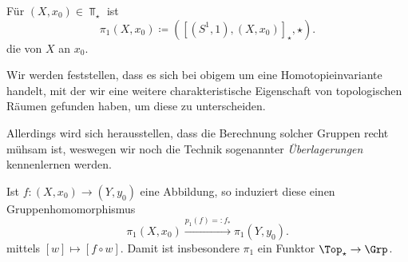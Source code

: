 \begin{definition}[Fundamentalgruppe]\label{def:fundamentalgruppe}
    Für $(X,x_0) \in \Top_{\star}$ ist 
    \[
        \pi_1(X,x_0) \coloneqq  ([(S^1,1),(X,x_0)]_{\star},\star)
    .\] 
    die  von $X$ an  $x_0$. 
\end{definition}

\begin{oral}
    Wir werden feststellen, dass es sich bei obigem um eine Homotopieinvariante handelt, mit der wir eine weitere charakteristische Eigenschaft von topologischen Räumen gefunden haben, um diese zu unterscheiden. 

    Allerdings wird sich herausstellen, dass die Berechnung solcher Gruppen recht mühsam ist, weswegen wir noch die Technik sogenannter \textit{Überlagerungen} kennenlernen werden.
\end{oral}

\begin{theorem}
    Ist $f\colon  (X,x_0) \to  (Y,y_0)$ eine Abbildung, so induziert diese einen Gruppenhomomorphismus
    \[
        \pi_1 (X,x_0) \stackrel{p_1(f) =: f_*}{\longrightarrow}   \pi_1(Y,y_0)
    .\] 
    mittels $[w] \mapsto [f \circ  w]$. Damit ist insbesondere $\pi_1$ ein Funktor $\Top_{\star} \to  \Grp$.
\end{theorem}

